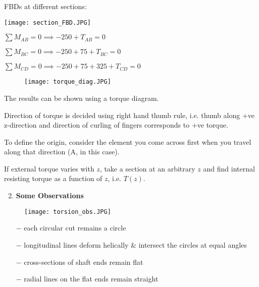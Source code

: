 \documentclass[11pt]{article}
\theoremstyle{definition}
\begin{document}
\hspace{0.5\textwidth}
\vspace{-1.5mm}

FBDs at different sections:
\vspace{2.5mm}

\texttt{[image: section\_FBD.JPG]}

$\sum M_{AB}=0\implies -250+T_{AB}=0$

$\sum M_{BC}=0\implies -250+75+T_{BC}=0$

$\sum M_{CD}=0\implies -250+75+325+T_{CD}=0$
\vspace{-10mm}
\begin{wrapfigure}[6]{R}{0.2\textwidth}
\centering \texttt{[image: torque\_diag.JPG]}
\end{wrapfigure}

\vspace{10mm}

The results can be shown using a torque diagram.

Direction of torque is decided using right hand thumb rule, i.e. thumb along +ve z-direction and direction of curling of fingers corresponds to +ve torque. 

To define the origin, consider the element you come across first when you travel along that direction (A, in this case).

If external torque varies with $z$, take a section at an arbitrary $z$ and find internal resisting torque as a function of $z$, i.e. $T(z)$.
\vspace{-2.5mm}

\begin{enumerate}[label=\textbf{\roman*)}]
	\setcounter{enumi}{1}
	\item \textbf{Some Observations}
\end{enumerate}
\vspace{-8mm}

\begin{wrapfigure}[8]{L}{0.27\textwidth}
\texttt{[image: torsion\_obs.JPG]}
\end{wrapfigure}

\hspace{0.5\textwidth}
\vspace{-7mm}

\begin{itemize}
\itemsep0em
	\item[$-$] each circular cut remains a circle
	\item[$-$] longitudinal lines deform helically \& intersect the circles at equal angles
	\item[$-$] cross-sections of shaft ends remain flat
	\item[$-$] radial lines on the flat ends remain straight
\end{itemize}
\vspace{-3mm}
\end{document}
